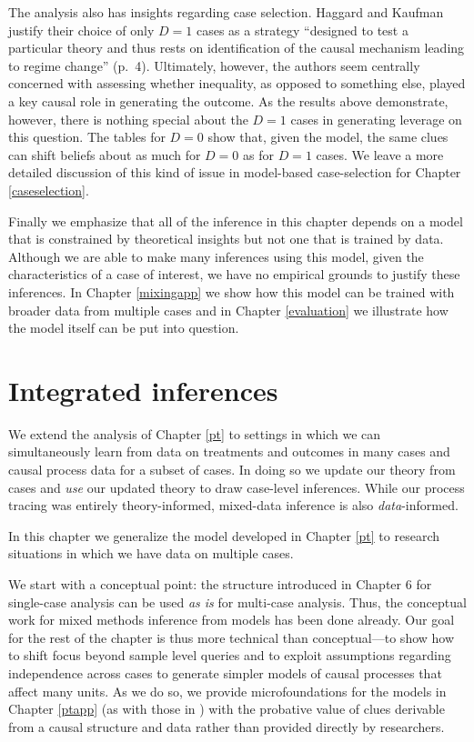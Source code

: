 \documentclass[
  12pt,
]{book}
\newenvironment{headerbox}{
  \definecolor{shadecolor}{rgb}{0.8, 0.8, 0.8}  %
  \color{black}
  \begin{shaded}}{\end{shaded}}
\begin{document}
The analysis also has insights regarding case selection. Haggard and Kaufman justify their choice of only \(D=1\) cases as a strategy ``designed to test a particular theory and thus rests on identification of the causal mechanism leading to regime change'' (p.~4). Ultimately, however, the authors seem centrally concerned with assessing whether inequality, as opposed to something else, played a key causal role in generating the outcome. As the results above demonstrate, however, there is nothing special about the \(D=1\) cases in generating leverage on this question. The tables for \(D=0\) show that, given the model, the same clues can shift beliefs about as much for \(D=0\) as for \(D=1\) cases. We leave a more detailed discussion of this kind of issue in model-based case-selection for Chapter \ref{caseselection}.

Finally we emphasize that all of the inference in this chapter depends on a model that is constrained by theoretical insights but not one that is trained by data. Although we are able to make many inferences using this model, given the characteristics of a case of interest, we have no empirical grounds to justify these inferences. In Chapter \ref{mixingapp} we show how this model can be trained with broader data from multiple cases and in Chapter \ref{evaluation} we illustrate how the model itself can be put into question.

\hypertarget{mixing}{%
\chapter{Integrated inferences}\label{mixing}}

\begin{headerbox}
We extend the analysis of Chapter \ref{pt} to settings in which we can simultaneously learn from data on treatments and outcomes in many cases and causal process data for a subset of cases. In doing so we update our theory from cases and \emph{use} our updated theory to draw case-level inferences. While our process tracing was entirely theory-informed, mixed-data inference is also \emph{data}-informed.

\end{headerbox}

In this chapter we generalize the model developed in Chapter \ref{pt} to research situations in which we have data on multiple cases.

We start with a conceptual point: the structure introduced in Chapter 6 for single-case analysis can be used \emph{as is} for multi-case analysis. Thus, the conceptual work for mixed methods inference from models has been done already. Our goal for the rest of the chapter is thus more technical than conceptual---to show how to shift focus beyond sample level queries and to exploit assumptions regarding independence across cases to generate simpler models of causal processes that affect many units. As we do so, we provide microfoundations for the models in Chapter \ref{ptapp} (as with those in \citet{humphreys2015mixing}) with the probative value of clues derivable from a causal structure and data rather than provided directly by researchers.
\end{document}
